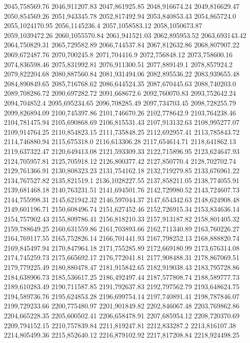 2045,758569.76
2046,911207.83
2047,861925.85
2048,916674.24
2049,816629.47
2050,854569.26
2051,943345.78
2052,817492.94
2053,840853.43
2054,865724.0
2055,1024170.95
2056,1145236.4
2057,1058583.12
2058,1050673.87
2059,1039472.26
2060,1055570.84
2061,941521.03
2062,895953.52
2063,693143.42
2064,750829.31
2065,729582.89
2066,744537.84
2067,812632.86
2068,807907.22
2069,672487.76
2070,700245.8
2071,704416.9
2072,756848.12
2073,758600.16
2074,836598.46
2075,831992.81
2076,911300.51
2077,889149.1
2078,857924.2
2079,822204.68
2080,887560.84
2081,931494.06
2082,895536.22
2083,939655.48
2084,890849.65
2085,716768.62
2086,644524.35
2087,670445.63
2088,740203.0
2089,708286.72
2090,697282.72
2091,668672.6
2092,760070.83
2093,752642.24
2094,704852.4
2095,695234.65
2096,708285.49
2097,734703.45
2098,728255.79
2099,826894.09
2100,745397.86
2101,746670.26
2102,778642.9
2103,764238.46
2104,781475.94
2105,690868.69
2106,815531.43
2107,913132.63
2108,995277.07
2109,914764.25
2110,854823.15
2111,735848.25
2112,692957.41
2113,785843.72
2114,746880.94
2115,675318.0
2116,613306.28
2117,654614.71
2118,641862.13
2119,637322.47
2120,649413.08
2121,593309.33
2122,715896.95
2123,624647.93
2124,705957.81
2125,705918.12
2126,800377.42
2127,850770.4
2128,702702.74
2129,761366.91
2130,808323.23
2131,754162.18
2132,719279.85
2133,676961.22
2134,767527.82
2135,821519.1
2136,1028227.55
2137,858211.05
2138,774055.91
2139,681468.18
2140,763231.51
2141,694501.76
2142,729980.52
2143,724607.73
2144,755998.31
2145,621942.32
2146,597044.37
2147,654342.63
2148,624908.48
2149,601196.71
2150,608496.74
2151,627452.46
2152,726915.34
2153,834636.14
2154,757902.43
2155,809786.41
2156,818210.33
2157,913187.82
2158,801405.32
2159,788649.25
2160,631559.86
2161,703893.66
2162,711340.89
2163,760226.27
2164,769117.55
2165,752826.14
2166,701441.93
2167,798252.13
2168,888820.74
2169,845497.94
2170,847964.18
2171,755285.89
2172,669180.99
2173,676314.08
2174,745259.73
2175,665692.17
2176,772041.81
2177,908488.31
2178,867069.51
2179,779225.49
2180,880478.47
2181,915842.65
2182,919038.43
2183,795728.86
2184,638906.73
2185,536617.25
2186,492497.44
2187,577808.74
2188,589777.73
2189,610283.49
2190,711587.85
2191,792637.83
2192,797562.79
2193,648624.75
2194,589736.76
2195,624853.28
2196,699754.14
2197,740891.41
2198,787846.07
2199,729233.66
2200,775480.97
2201,901849.82
2202,846067.48
2203,769862.86
2204,665228.35
2205,600502.41
2206,658478.91
2207,685954.12
2208,720370.69
2209,794152.15
2210,757839.84
2211,819247.81
2212,833287.2
2213,816107.38
2214,805499.36
2215,852640.12
2216,879102.92
2217,817208.84
2218,924498.25
